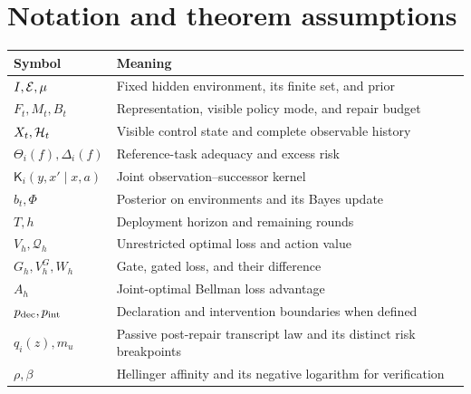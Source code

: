 \section{Notation and theorem assumptions}
\begin{longtable}{p{.24\linewidth}p{.68\linewidth}}
\toprule
Symbol & Meaning\\
\midrule
$I,\mathcal E,\mu$ & Fixed hidden environment, its finite set, and prior\\
$F_t,M_t,B_t$ & Representation, visible policy mode, and repair budget\\
$X_t,\mathcal H_t$ & Visible control state and complete observable history\\
$\Theta_i(f),\Delta_i(f)$ & Reference-task adequacy and excess risk\\
$\mathsf K_i(y,x'\mid x,a)$ & Joint observation--successor kernel\\
$b_t,\Phi$ & Posterior on environments and its Bayes update\\
$T,h$ & Deployment horizon and remaining rounds\\
$V_h,\mathcal Q_h$ & Unrestricted optimal loss and action value\\
$G_h,V_h^G,W_h$ & Gate, gated loss, and their difference\\
$A_h$ & Joint-optimal Bellman loss advantage\\
$p_{\mathrm{dec}},p_{\mathrm{int}}$ & Declaration and intervention boundaries when defined\\
$q_i(z),m_u$ & Passive post-repair transcript law and its distinct risk breakpoints\\
$\rho,\beta$ & Hellinger affinity and its negative logarithm for verification\\
\bottomrule
\end{longtable}

